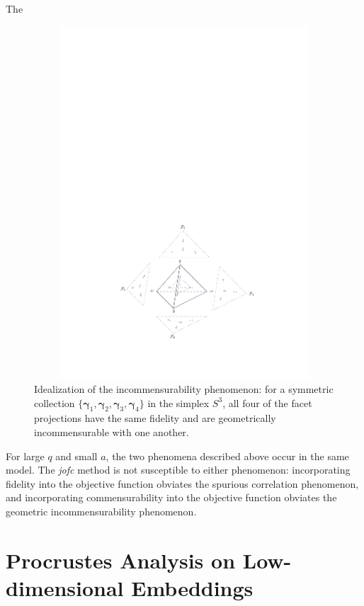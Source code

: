 \documentclass[12pt,oneside,final]{thesis}\usepackage[]{graphicx}\usepackage[]{color}
\begin{document}
The
  \begin{figure}
  \begin{center}
    \includegraphics[height=13.2cm, width=15.84cm,angle=0]{ZMfacetprojections3d.pdf}
    \caption{Idealization of the incommensurability phenomenon:
    for a symmetric collection $\{\bm{\gamma}_1,\bm{\gamma}_2,\bm{\gamma}_3,\bm{\gamma}_4\}$ in the simplex $S^3$,
    all four of the facet projections have the same fidelity and are geometrically incommensurable with one another.}\label{fig:incomm}
  \end{center}
  \end{figure}

For large $q$ and small $a$, the two phenomena described above occur in the same model.
The {\it jofc} method is not susceptible to either phenomenon:
incorporating fidelity into the objective function obviates the spurious correlation phenomenon, and
incorporating commensurability into the objective function obviates the geometric incommensurability phenomenon.







\chapter{Procrustes Analysis on Low-dimensional Embeddings}
\label{sec:PoM}
\end{document}
